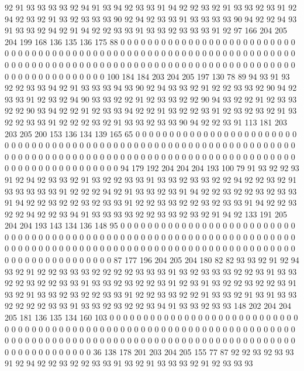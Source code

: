 92 91 93 93 93 93 92 94 91 93 94 92 93 93 91 94 92 92 93 92
91 93 93 92 93 91 92 94 92 93 92 91 93 92 93 93 93 90 92 94
92 93 93 91 93 93 93 93 90 94 92 92 94 93 91 93 93 92 94 92
91 94 92 92 93 93 91 93 93 92 93 93 93 91 92 97 166 204 205 204
199 168 136 135 136 175 88 0 0 0 0 0 0 0 0 0 0 0 0 0
0 0 0 0 0 0 0 0 0 0 0 0 0 0 0 0 0 0 0 0
0 0 0 0 0 0 0 0 0 0 0 0 0 0 0 0 0 0 0 0
0 0 0 0 0 0 0 0 0 0 0 0 0 0 0 0 0 0 0 0
0 0 0 0 0 0 0 0 0 0 0 0 0 0 0 0 0 0 0 0
0 0 0 0 0 0 0 0 0 0 0 0 0 0 0 0 0 0 0 0
0 0 0 0 0 0 0 0 0 0 0 0 0 0 100 184 184 203 204 205
197 130 78 89 94 93 91 93 92 92 93 93 94 92 91 93 93 93 94 93
90 92 94 93 93 92 91 92 92 93 93 92 90 94 92 93 93 91 92 93
92 94 90 93 93 92 92 91 92 93 93 92 92 90 94 93 92 92 91 92
93 93 92 92 90 93 94 92 92 91 92 93 93 94 92 92 91 93 92 92
93 91 92 93 92 93 92 91 93 92 92 93 93 91 92 92 92 93 92 91
93 93 92 93 93 90 94 92 92 93 91 113 181 203 203 205 200 153 136 134
139 165 65 0 0 0 0 0 0 0 0 0 0 0 0 0 0 0 0 0
0 0 0 0 0 0 0 0 0 0 0 0 0 0 0 0 0 0 0 0
0 0 0 0 0 0 0 0 0 0 0 0 0 0 0 0 0 0 0 0
0 0 0 0 0 0 0 0 0 0 0 0 0 0 0 0 0 0 0 0
0 0 0 0 0 0 0 0 0 0 0 0 0 0 0 0 0 0 0 0
0 0 0 0 0 0 0 0 0 0 0 0 0 0 0 0 0 0 0 0
0 0 0 0 0 0 0 0 0 0 94 179 192 204 204 204 193 100 79 91
93 92 92 93 91 92 94 92 93 93 92 91 93 92 92 93 93 91 93 93
92 93 93 92 92 94 92 92 93 92 91 93 93 93 93 93 91 92 92 92
94 92 91 93 93 92 93 91 94 92 92 93 92 92 93 92 93 93 91 94
92 92 93 92 92 93 92 93 93 91 92 92 93 93 92 92 93 92 93 93
91 94 92 92 93 92 92 94 92 92 93 94 91 93 93 93 93 92 92 93
93 92 93 92 91 94 92 133 191 205 204 204 193 143 134 136 148 95 0 0
0 0 0 0 0 0 0 0 0 0 0 0 0 0 0 0 0 0 0 0
0 0 0 0 0 0 0 0 0 0 0 0 0 0 0 0 0 0 0 0
0 0 0 0 0 0 0 0 0 0 0 0 0 0 0 0 0 0 0 0
0 0 0 0 0 0 0 0 0 0 0 0 0 0 0 0 0 0 0 0
0 0 0 0 0 0 0 0 0 0 0 0 0 0 0 0 0 0 0 0
0 0 0 0 0 0 0 0 0 0 0 0 0 0 0 0 0 0 0 0
0 0 0 0 0 0 87 177 196 204 205 204 180 82 82 93 93 92 91 92
94 93 92 91 92 92 93 93 93 92 92 92 92 93 93 93 91 93 92 93
93 93 92 92 93 91 93 93 92 92 93 92 92 93 93 91 93 93 92 93
92 92 93 91 92 93 91 93 92 92 93 92 92 93 91 93 92 91 93 93
92 93 92 92 93 93 91 92 92 93 93 92 92 91 93 93 92 91 93 91
93 93 92 92 92 92 93 93 91 93 93 92 93 92 92 93 94 91 93 93
92 93 93 148 202 204 204 205 181 136 135 134 160 103 0 0 0 0 0 0
0 0 0 0 0 0 0 0 0 0 0 0 0 0 0 0 0 0 0 0
0 0 0 0 0 0 0 0 0 0 0 0 0 0 0 0 0 0 0 0
0 0 0 0 0 0 0 0 0 0 0 0 0 0 0 0 0 0 0 0
0 0 0 0 0 0 0 0 0 0 0 0 0 0 0 0 0 0 0 0
0 0 0 0 0 0 0 0 0 0 0 0 0 0 0 0 0 0 0 0
0 0 0 0 0 0 0 0 0 0 0 0 0 0 0 0 0 0 0 0
0 36 138 178 201 203 204 205 155 77 87 92 92 93 92 93 93 91 92 94
92 92 93 92 92 93 93 91 93 92 91 93 93 93 92 91 92 93 93 93
